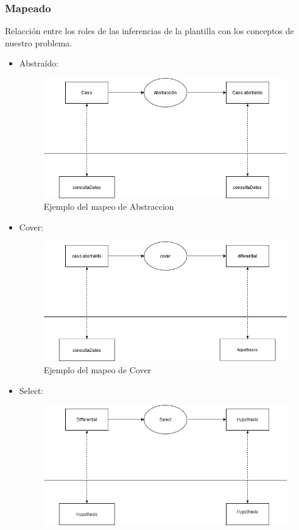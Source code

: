 \subsubsection{Mapeado}
Relacción entre los roles de las inferencias de la plantilla con los conceptos de nuestro problema.
\begin{itemize}
  \item Abstraído:
  \begin{figure}[H]
    \centering
    \includegraphics[scale=0.50]{imagenes/abstraccion.png}
    \caption{\label{fig:Cover}Ejemplo del mapeo de Abstraccion}
  \end{figure}
  \item Cover:  
  \begin{figure}[H]
    \centering
    \includegraphics[scale=0.50]{imagenes/cover.png}
    \caption{\label{fig:Cover}Ejemplo del mapeo de Cover}
  \end{figure}
  \item Select: 
  \begin{figure}[H]
    \centering
    \includegraphics[scale=0.50]{imagenes/select.png}

\end{figure}
\end{itemize}
